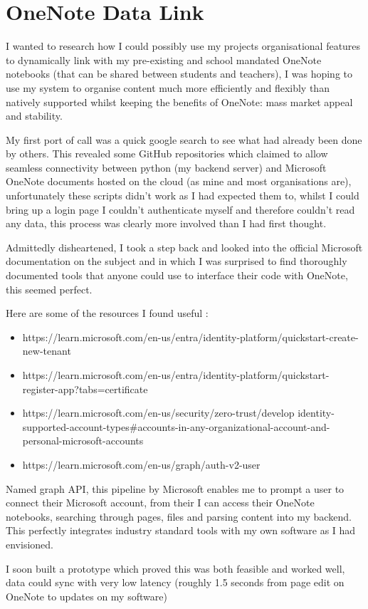 \section{OneNote Data Link}
\label{research:OneNoteDataLink}
I wanted to research how I could possibly use my projects organisational features to dynamically link with my pre-existing and school mandated OneNote notebooks (that can be shared between students and teachers), I was hoping to use my system to organise content much more efficiently and flexibly than natively supported whilst keeping the benefits of OneNote: mass market appeal and stability. 

My first port of call was a quick google search to see what had already been done by others. This revealed some GitHub repositories which claimed to allow seamless connectivity between python (my backend server) and Microsoft OneNote documents hosted on the cloud (as mine and most organisations are), unfortunately these scripts didn't work as I had expected them to, whilst I could bring up a login page I couldn't authenticate myself and therefore couldn't read any data, this process was clearly more involved than I had first thought.

Admittedly disheartened, I took a step back and looked into the official Microsoft documentation on the subject and in which I was surprised to find thoroughly documented tools that anyone could use to interface their code with OneNote, this seemed perfect.

Here are some of the resources I found useful \cite{wibjornMicrosoftLearnBuild} :
\begin{itemize}
    \item https://learn.microsoft.com/en-us/entra/identity-platform/quickstart-create-new-tenant
    \item https://learn.microsoft.com/en-us/entra/identity-platform/quickstart-register-app?tabs=certificate
    \item https://learn.microsoft.com/en-us/security/zero-trust/develop identity-supported-account-types\#accounts-in-any-organizational-account-and-personal-microsoft-accounts
    \item https://learn.microsoft.com/en-us/graph/auth-v2-user 
\end{itemize}

Named graph API, this pipeline by Microsoft enables me to prompt a user to connect their Microsoft account, from their I can access their OneNote notebooks, searching through pages, files and parsing content into my backend. This perfectly integrates industry standard tools with my own software as I had envisioned.

I soon built a prototype which proved this was both feasible and worked well, data could sync with very low latency (roughly 1.5 seconds from page edit on OneNote to updates on my software)

